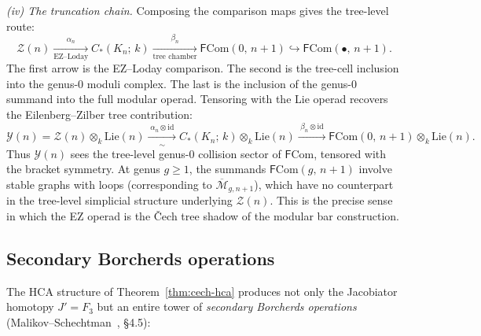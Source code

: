 \begin{remark}
\smallskip\noindent\emph{(iv) The truncation chain.}
Composing the comparison maps gives the tree-level route:
\[
\mathcal{Z}(n)
 \xrightarrow[\text{EZ--Loday}]{\;\alpha_n\;}
C_*(K_n;\, k)
 \xrightarrow[\text{tree chamber}]{\;\beta_n\;}
\mathsf{F}\mathrm{Com}(0,\, n{+}1)
 \hookrightarrow
\mathsf{F}\mathrm{Com}(\bullet,\, n{+}1).
\]
The first arrow is the EZ--Loday comparison.  The second is the
tree-cell inclusion into the genus-$0$ moduli complex.  The last is
the inclusion of the genus-$0$ summand into the full modular operad.
Tensoring with the Lie operad recovers the Eilenberg--Zilber
tree contribution:
\[
\mathcal{Y}(n) = \mathcal{Z}(n) \otimes_k \mathrm{Lie}(n)
\xrightarrow[\sim]{\;\alpha_n \otimes \mathrm{id}\;}
C_*(K_n;\, k) \otimes_k \mathrm{Lie}(n)
\xrightarrow{\;\beta_n \otimes \mathrm{id}\;}
\mathsf{F}\mathrm{Com}(0,\, n{+}1) \otimes_k \mathrm{Lie}(n).
\]
Thus $\mathcal{Y}(n)$ sees the tree-level genus-$0$ collision
sector of $\mathsf{F}\mathrm{Com}$, tensored with the bracket
symmetry.
At genus $g \geq 1$, the summands
$\mathsf{F}\mathrm{Com}(g,\, n{+}1)$ involve stable graphs with
loops (corresponding to $\overline{\mathcal{M}}_{g,n+1}$), which
have no counterpart in the tree-level simplicial structure
underlying $\mathcal{Z}(n)$. This is the precise sense in which
the EZ operad is the \v{C}ech tree shadow of the modular
bar construction.
\end{remark}

\subsection{Secondary Borcherds operations}
\label{subsec:secondary-borcherds}

The HCA structure of Theorem~\ref{thm:cech-hca} produces not only
the Jacobiator homotopy $J' = F_3$ but an entire tower of
\emph{secondary Borcherds operations}
(Malikov--Schechtman~\cite{MS24}, \S4.5):

